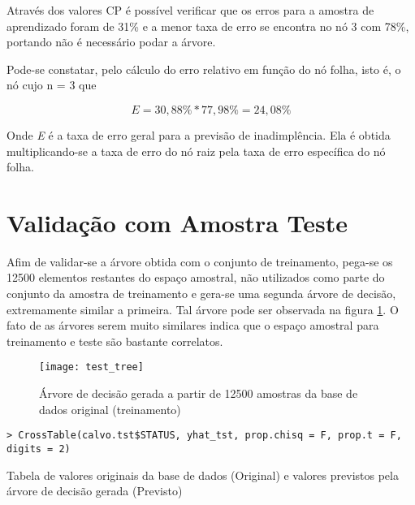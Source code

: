 Através dos valores CP é possível verificar que os erros para a amostra
de aprendizado foram de 31\% e a menor taxa de erro se encontra no
nó 3 com 78\%, portando não é necessário podar a árvore. 

Pode-se constatar, pelo cálculo do erro relativo em função do nó folha, isto é, o nó cujo n = 3 que

\[
E=30,88\%*77,98\%=24,08\%
\]

Onde \emph{E} é a taxa de erro geral para a previsão de inadimplência. Ela é obtida multiplicando-se a taxa de erro do nó raiz pela taxa de erro específica do nó folha.

\clearpage

\section{Validação com Amostra Teste}

Afim de validar-se a árvore obtida com o conjunto de treinamento, pega-se os 12500 elementos restantes do espaço amostral, não utilizados como parte do conjunto da amostra de treinamento e gera-se uma segunda árvore de decisão, extremamente similar a primeira. Tal árvore pode ser observada na figura \ref{fig:TestTree}. O fato de as árvores serem muito similares indica que o espaço amostral para treinamento e teste são bastante correlatos.

\begin{center}
\begin{figure}[h]
\begin{centering}
\texttt{[image: test\_tree]}
\par\end{centering}
\caption{\label{fig:TestTree}Árvore de decisão gerada a partir de 12500 amostras da base de dados original (treinamento)}
\end{figure}
\vspace*{-40pt}
\par\end{center}


\begin{verbatim}
> CrossTable(calvo.tst$STATUS, yhat_tst, prop.chisq = F, prop.t = F, digits = 2)
\end{verbatim}

\begin{table}[h]
\centering

  \caption{\label{tab:StatusPrevisao}Tabela de valores originais da base de dados (Original) e valores previstos pela árvore de decisão gerada (Previsto)}
\end{table}

